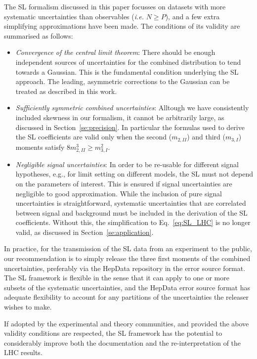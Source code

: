 \documentclass[11pt]{article}
\begin{document}
The SL formalism discussed in this paper focusses on datasets with more systematic uncertainties than observables
 (\textit{i.e.} $N\geq P$), and a few extra simplifying approximations have been made.  
The conditions of its validity are summarised as follows:
\begin{itemize}
\item \textit{Convergence of the central limit theorem}: 
There should be enough independent sources of uncertainties for the combined distribution to tend towards a Gaussian. 
This is the fundamental condition underlying the SL approach. The leading, asymmetric corrections to the Gaussian 
can be treated as described in this work.
\item \textit{Sufficiently symmetric combined uncertainties}: Alltough we have consistently included skewness in our formalism, it cannot be arbitrarily large, as discussed in Section~\ref{se:precision}. In particular the formulas used to derive the SL coefficients are valid only when the second ($m_{2,II}$) and third ($m_{3,I}$) moments satisfy $8m^{3}_{2,II}\geq m^{2}_{3,I}$. 
\item \textit{Negligible signal uncertainties}: In order to be re-usable for different signal hypotheses, e.g., for limit setting on different models, 
the SL must not depend on the parameters of interest. This is ensured if signal uncertainties are negligible to good approximation.    
While the inclusion of pure signal uncertainties is straightforward, systematic uncertainties that are correlated between signal and background must be included in the derivation of the SL coefficients. Without this, the simplification to Eq.~\eqref{eq:SL_LHC} is no longer valid, as discussed in Section~\ref{se:application}. 
\end{itemize}


In practice, for the transmission of the SL data from an experiment to the public, our recommendation is to simply release the three first moments of the combined uncertainties, preferably via the HepData repository in the error source format.  The SL framework is flexible in the sense that it can apply to one or more subsets of the systematic uncertainties,  and the HepData error source format  has adequate flexibility to account for any partitions of the uncertainties the releaser wishes to make.

If adopted by the experimental and theory communities, and provided the above validity conditions are respected, 
the SL framework has the potential to considerably improve both the documentation and the re-interpretation of the LHC results.
\end{document}
